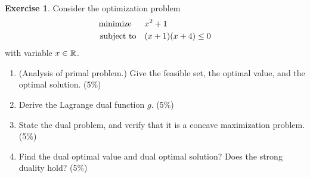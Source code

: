 \documentclass[12pt]{extarticle}
\theoremstyle{definition}
\newtheorem{exercise}{Exercise}
\begin{document}
\begin{exercise}
  Consider the optimization problem
  \begin{align*}
    \text{minimize\;\;}\quad& x^2+1\\
    \text{subject to}  \quad& (x+1)(x+4)\le 0
  \end{align*}
  with variable $x\in\mathbb{R}$.
  \begin{enumerate}[label=(\alph*)]
    \item (Analysis of primal problem.) Give the feasible set, the optimal value, and the optimal solution. (5\%)
    \item Derive the Lagrange dual function $g$. (5\%)
    \item State the dual problem, and verify that it is a concave maximization problem. (5\%)
    \item Find the dual optimal value and dual optimal solution? Does the strong duality hold? (5\%)
  \end{enumerate}
\end{exercise}
\end{document}
